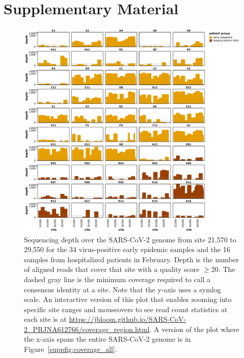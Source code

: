 \documentclass[9pt,twocolumn,twoside]{gsajnl_modified}
\begin{document}


\clearpage
\onecolumn
\renewcommand{\thepage}{S\arabic{page}}
\setcounter{page}{1}
\renewcommand{\thefigure}{S\arabic{figure}}
\setcounter{figure}{0}

\section{Supplementary Material}

\begin{figure}[h!]
\centering
\includegraphics[width=\linewidth]{figures/coverage_region.pdf}
\caption{Sequencing depth over the SARS-CoV-2 genome from site 21,570 to 29,550 for the 34 virus-positive early epidemic samples and the 16 samples from hospitalized patients in February.
Depth is the number of aligned reads that cover that site with a quality score $\ge$20.
The dashed gray line is the minimum coverage required to call a consensus identity at a site.
Note that the y-axis uses a symlog scale.
An interactive version of this plot that enables zooming into specific site ranges and mouseovers to see read count statistics at each site is at \url{https://jbloom.github.io/SARS-CoV-2_PRJNA612766/coverage_region.html}.
A version of the plot where the x-axis spans the entire SARS-CoV-2 genome is in Figure~\ref{suppfig:coverage_all}.
}
\label{suppfig:coverage}
\end{figure}
\end{document}
